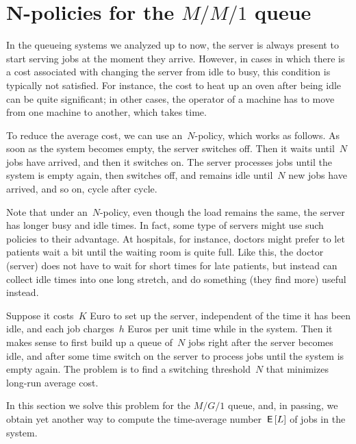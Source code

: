 \documentclass[queueing-book.tex]{subfiles}
\begin{document}
\section{N-policies for the $M/M/1$ queue}
\label{sec:n-policies}


In the queueing systems we analyzed up to now, the server is always present to start serving jobs at the moment they arrive.
However, in cases in which there is a cost associated with changing the server from idle to busy, this condition is typically not satisfied.
For instance, the cost to heat up an oven after being idle can be quite significant; in other cases, the operator of a machine has to move from one machine to another, which takes time.


To reduce the average cost, we can use an~$N$-policy, which works as follows.
As soon as the system becomes empty, the server switches off.
Then it waits until~$N$ jobs have arrived, and then it switches on.
The server processes jobs until the system is empty again, then switches off, and remains idle until~$N$ new jobs have arrived, and so on, cycle after cycle.

Note that under an~$N$-policy, even though the load remains the same, the server has longer busy and idle times.
In fact, some type of servers might use such policies to their advantage.
At hospitals, for instance, doctors might prefer to let patients wait a bit until the waiting room is quite full.
Like this, the doctor (server) does not have to wait for short times for late patients, but instead can collect idle times into one long stretch, and do something (they find more) useful instead.

Suppose it costs~$K$ Euro to set up the server, independent of the time it has been idle, and each job charges~$h$ Euros per unit time while in the system.
Then it makes sense to first build up a queue of~$N$ jobs right after the server becomes idle,
and after some time switch on the server to process jobs until the system is empty again.
The problem is to find a switching threshold~$N$ that minimizes long-run average cost.


In this section we solve this problem for the $M/G/1$ queue, and, in passing, we obtain yet another way to compute the time-average number $\,\mathsf{E}\left[L\right]$ of jobs in the system.
\end{document}
